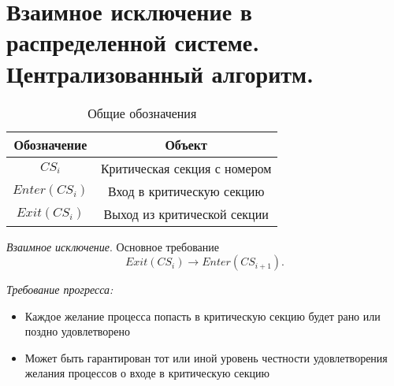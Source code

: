 \section{Взаимное исключение в распределенной системе. Централизованный алгоритм.}

\begin{table}[!ht]
    \centering
    \begin{tabular}{|c|c|} \hline
        Обозначение & Объект \\ \hline
        $CS_i$ & Критическая секция с номером \\ \hline
        $Enter(CS_i)$ & Вход в критическую секцию \\ \hline
        $Exit(CS_i)$ & Выход из критической секции \\ \hline
    \end{tabular}
    \caption{Общие обозначения}
\end{table}

\begin{definition}
    \textit{Взаимное исключение}. Основное требование
    \[
        Exit(CS_i) \to Enter(CS_{i+1})
    .\]
\end{definition}

\begin{definition}
    \textit{Требование прогресса:}
    \begin{itemize}
        \item Каждое желание процесса попасть в критическую секцию будет 
        рано или поздно удовлетворено
        \item Может быть гарантирован тот или иной уровень честности удовлетворения желания процессов о входе в критическую
        секцию
    \end{itemize}

\end{definition}

